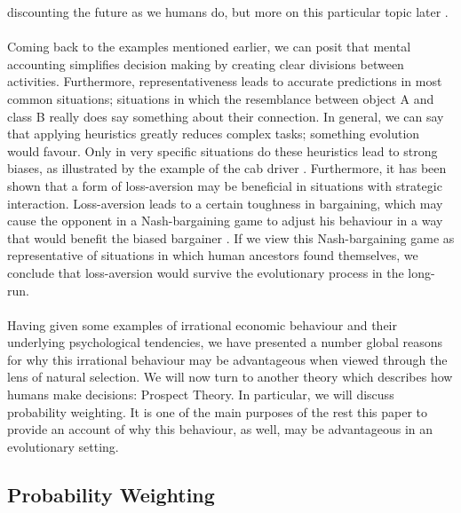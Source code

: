 \documentclass[a4paper,10pt]{article}
\numberwithin{equation}{section}
\begin{document}
discounting the future as we humans do, but more on this particular topic later \cite{Richards1997}.\\
\\
Coming back to the examples mentioned earlier, we can posit that mental accounting simplifies decision making by creating clear divisions between activities. Furthermore, representativeness leads to accurate predictions in most common situations; situations in which the resemblance between object A and class B really does say something about their connection. In general, we can say that applying heuristics greatly reduces complex tasks; something evolution would favour. Only in very specific situations do these heuristics lead to strong biases, as illustrated by the example of the cab driver \cite{Tversky1974}. Furthermore, it has been shown that a form of loss-aversion may be beneficial in situations with strategic interaction. Loss-aversion leads to a certain toughness in bargaining, which may cause the opponent in a Nash-bargaining game to adjust his behaviour in a way that would benefit the biased bargainer \cite{Huck2005, Heifetz2004}. If we view this Nash-bargaining game as representative of situations in which human ancestors found themselves, we conclude that loss-aversion would survive the evolutionary process in the long-run.\\
\\
Having given some examples of irrational economic behaviour and their underlying psychological tendencies, we have presented a number global reasons for why this irrational behaviour may be advantageous when viewed through the lens of natural selection. We will now turn to another theory which describes how humans make decisions: Prospect Theory. In particular, we will discuss probability weighting. It is one of the main purposes of the rest this paper to provide an account of why this behaviour, as well, may be advantageous in an evolutionary setting.


\subsection{Probability Weighting}
\label{sec:Probability Weighting}
\end{document}
